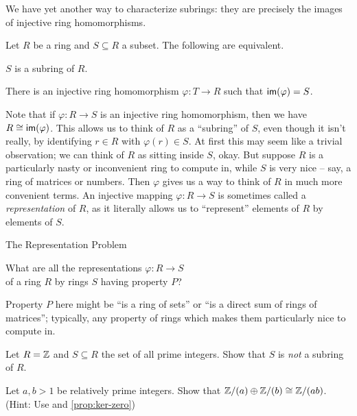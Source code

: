 We have yet another way to characterize subrings: they are precisely the images of injective ring homomorphisms.

\begin{prop}
Let \(R\) be a ring and \(S \subseteq R\) a subset. The following are equivalent.
\begin{proplist}
\item \(S\) is a subring of \(R\).
\item There is an injective ring homomorphism \(\varphi : T \rightarrow R\) such that \( \mathsf{im}(\varphi)  = S\).
\end{proplist}
\end{prop}

Note that if \(\varphi : R \rightarrow S\) is an injective ring homomorphism, then we have \(R \cong  \mathsf{im}(\varphi) \). This allows us to think of \(R\) as a ``subring'' of \(S\), even though it isn't really, by identifying \(r \in R\) with \(\varphi(r) \in S\). At first this may seem like a trivial observation; we can think of \(R\) as sitting inside \(S\), okay. But suppose \(R\) is a particularly nasty or inconvenient ring to compute in, while \(S\) is very nice -- say, a ring of matrices or numbers. Then \(\varphi\) gives us a way to think of \(R\) in much more convenient terms. An injective mapping \(\varphi : R \rightarrow S\) is sometimes called a \emph{representation} of \(R\), as it literally allows us to ``represent'' elements of \(R\) by elements of \(S\).
\begin{titlebox}{The Representation Problem}
\begin{center}
What are all the representations \(\varphi : R \rightarrow S\) \\ of a ring \(R\) by rings \(S\) having property \(P\)?
\end{center}
\end{titlebox}
Property \(P\) here might be ``is a ring of sets'' or ``is a direct sum of rings of matrices''; typically, any property of rings which makes them particularly nice to compute in.



\Exercises%

\begin{exercise}
Let \(R = \mathbb{Z}\) and \(S \subseteq R\) the set of all prime integers. Show that \(S\) is \emph{not} a subring of \(R\).
\end{exercise}

\begin{exercise}
Let \(a, b > 1\) be relatively prime integers. Show that \(\mathbb{Z}/(a) \oplus \mathbb{Z}/(b) \cong \mathbb{Z}/(ab)\). (Hint: Use  and \ref{prop:ker-zero})
\end{exercise}

